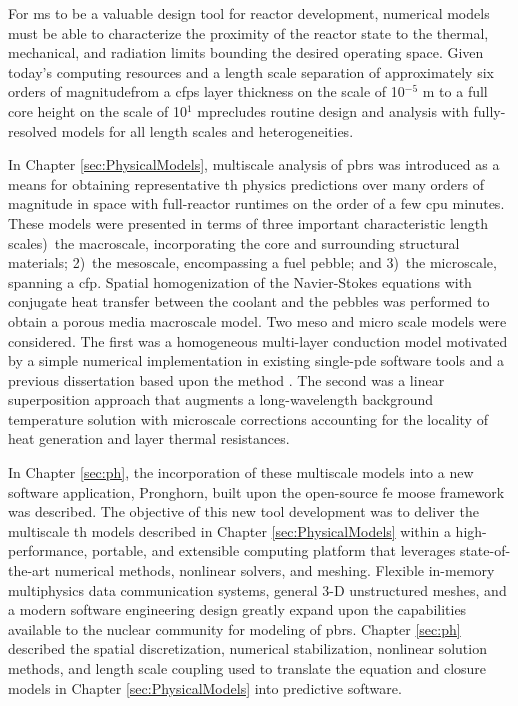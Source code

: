 For \gls{ms} to be a valuable design tool for reactor development, numerical models must be able to characterize the proximity of the reactor state to the thermal, mechanical, and radiation limits bounding the desired operating space. Given today's computing resources and a length scale separation of approximately six orders of magnitude\mdash from a \glspl{cfp} layer thickness on the scale of 10$^{-5}$ \si{\meter} to a full core height on the scale of 10$^1$ \si{\meter}\mdash precludes routine design and analysis with fully-resolved models for all length scales and heterogeneities.

In Chapter \ref{sec:PhysicalModels}, multiscale analysis of \glspl{pbr} was introduced as a means for obtaining representative \gls{th} physics predictions over many orders of magnitude in space with full-reactor runtimes on the order of a few \gls{cpu} minutes. These models were presented in terms of three important characteristic length scales)~the macroscale, incorporating the core and surrounding structural materials; 2)~the mesoscale, encompassing a fuel pebble; and 3)~the microscale, spanning a \gls{cfp}. Spatial homogenization of the Navier-Stokes equations with conjugate heat transfer between the coolant and the pebbles was performed to obtain a porous media macroscale model. Two meso and micro scale models were considered. The first was a homogeneous multi-layer conduction model motivated by a simple numerical implementation in existing single-\gls{pde} software tools and a previous dissertation based upon the method \cite{xin_wang_thesis}. The second was a linear superposition approach that augments a long-wavelength background temperature solution with microscale corrections accounting for the locality of heat generation and layer thermal resistances. 

In Chapter \ref{sec:ph}, the incorporation of these multiscale models into a new software application, Pronghorn, built upon the open-source \gls{fe} \gls{moose} framework was described. The objective of this new tool development was to deliver the multiscale \gls{th} models described in Chapter \ref{sec:PhysicalModels} within a high-performance, portable, and extensible computing platform that leverages state-of-the-art numerical methods, nonlinear solvers, and meshing. Flexible in-memory multiphysics data communication systems, general 3-D unstructured meshes, and a modern software engineering design greatly expand upon the capabilities available to the nuclear community for modeling of \glspl{pbr}. Chapter \ref{sec:ph} described the spatial discretization, numerical stabilization, nonlinear solution methods, and length scale coupling used to translate the equation and closure models in Chapter \ref{sec:PhysicalModels} into predictive software.

